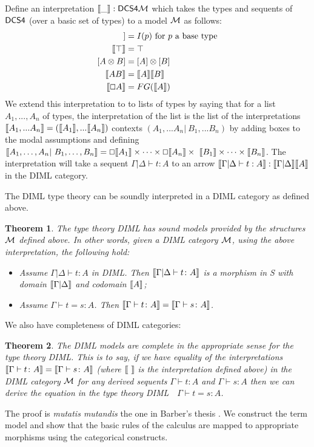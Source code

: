 \documentclass{article}
\let\to\relax
\newcommand{\to}{\rightarrow}
\renewcommand{\Box}{\oblong}
\def\sem#1{[\hspace{-0.05cm}[#1]\hspace{-0.05cm}]}
\newtheorem{theorem}{Theorem}
\begin{document}
Define an interpretation $\sem{\_} : \sf{DCS4} \to {\cal M}$ which takes the types and sequents of $\sf{DCS4}$ (over a basic 
set of types)  to a model $\cal M$ as follows:
\begin{align*}
\sem{p} &= I(p) \mbox{  for $p$ a base type}\\
\sem{\top} &= \top\\
[A\otimes B] &= [A]\otimes [B]\\
\sem{  A \to B  } &=  \sem{ A}  \to  \sem{ B }\\
\sem{\Box A} &= F G(\sem{A})
\end{align*}
 We extend this interpretation to 
 to lists of types by saying that for a list $A_1, ..., A_n$ of types,
 the interpretation of the list is the list of the interpretations
 $\sem{A_1,...A_n} = (\sem{A_1}, . . . \sem{A_n})$ 
contexts $(A_1,...A_n | \ B_1,...B_n)$ by adding boxes to the modal
assumptions and defining
$ \sem{A_1,\ldots, A_n |\  B_1,\ldots,B_n} = 
\Box \sem{A_1}\times \cdots \times \Box \sem{A_n} \times
\  \sem{B_1}\times \cdots \times\sem{B_n} $.
The interpretation will take a sequent $\Gamma|\Delta \vdash t : A$ to an arrow 
$ \sem {\Gamma|\Delta \vdash t : A} : \sem{ \Gamma|\Delta} \to \sem{A} $
in the DIML category.

The DIML type theory can be soundly interpreted in a DIML category as defined above.
\begin{theorem}
\label{thm:diml-sound}
The type theory DIML has  \textit{sound} models provided by the structures $\cal M$ defined above.
In other words, given a DIML category $\cal M$, using the above interpretation, the following hold:
\begin{itemize}
\item Assume $\Gamma|\Delta \vdash t : A$ in DIML. Then $\sem{\Gamma |
    \Delta \vdash t \colon A}$ is a morphism in S with domain
  $\sem{\Gamma | \Delta}$ and codomain $\sem{A}$;
\item Assume $\Gamma \vdash t = s \colon A$. Then $\sem{\Gamma
  \vdash t \colon A} = \sem{\Gamma \vdash s \colon A}$.
\end{itemize}
\end{theorem}

We also have completeness of DIML categories:
\begin{theorem}
\label{thm:diml-completeness}
The DIML models are \textit{complete} in the appropriate sense for the type theory DIML. This is to say, if
we have equality of the interpretations $\sem{\Gamma \vdash t \colon A} = \sem{\Gamma  \vdash s \colon A}$
 (where \mbox{$\sem{\ } $} is the interpretation defined above)
 in the
DIML category $\cal M$
   for any derived sequents $\Gamma \vdash t \colon A$
 and $\Gamma \vdash s \colon A$ 
 then we can derive the  equation in the type theory DIML $\;$
 $\Gamma \vdash t = s \colon A$. 
\end{theorem}
The proof is \textit{mutatis mutandis} the one in Barber's thesis \cite{barber-plotkin:dill}.
We construct the term model and show that the basic rules of the calculus are mapped to 
appropriate morphisms using  the categorical constructs. 
\end{document}
